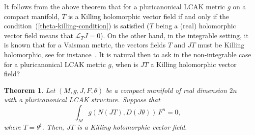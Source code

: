 \documentclass[a4paper,11pt]{amsart}
\newtheorem{thm}{Theorem}
\theoremstyle{definition}
\renewcommand{\[}{\begin{equation*}}
\renewcommand{\]}{\end{equation*}}
\begin{document}
It follows from the above theorem that for a pluricanonical LCAK metric $g$ on a compact manifold, $T$ is a Killing holomorphic vector field if and only if the condition~(\ref{theta-killing-condition}) is satisfied ($T$ being a (real) holomorphic vector field means that $\mathcal{L}_TJ=0$). On the other hand, in the integrable setting,
it is known that for a Vaisman metric, the vectors fields $T$ and $JT$ must be Killing holomorphic, see for instance~\cite{MR4771164}. It is natural then to ask in the non-integrable case for a pluricanonical LCAK metric $g$, when is $JT$ a Killing holomorphic vector field?
\begin{thm}
Let $(M, g, J, F, \theta)$ be a compact manifold of real dimension $2n$ with a pluricanonical LCAK structure. Suppose that $$\int_Mg(N(JT),D\left(J\theta\right))\,F^n=0,$$ where $T=\theta^\sharp$. Then, $JT$ is a Killing holomorphic vector field.
\end{thm}
\end{document}
